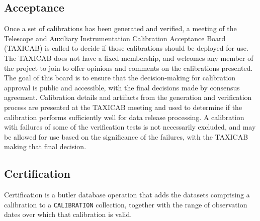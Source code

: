 
\subsection{Acceptance} \label{sec:verify-accept-certify:acceptance}

Once a set of calibrations has been generated and verified, a meeting of the Telescope and Auxiliary Instrumentation Calibration Acceptance Board (TAXICAB) is called to decide if those calibrations should be deployed for use.
The TAXICAB does not have a fixed membership, and welcomes any member of the project to join to offer opinions and comments on the calibrations presented.
The goal of this board is to ensure that the decision-making for calibration approval is public and accessible, with the final decisions made by consensus agreement.
Calibration details and artifacts from the generation and verification process are presented at the TAXICAB meeting and used to determine if the calibration performs sufficiently well for data release processing.
A calibration with failures of some of the verification tests is not necessarily excluded, and may be allowed for use based on the significance of the failures, with the TAXICAB making that final decision.


\subsection{Certification} \label{sec:verify-accept-certify:certification}

Certification is a butler database operation that adds the datasets comprising a calibration to a \texttt{CALIBRATION} collection, together with the range of observation dates over which that calibration is valid.

